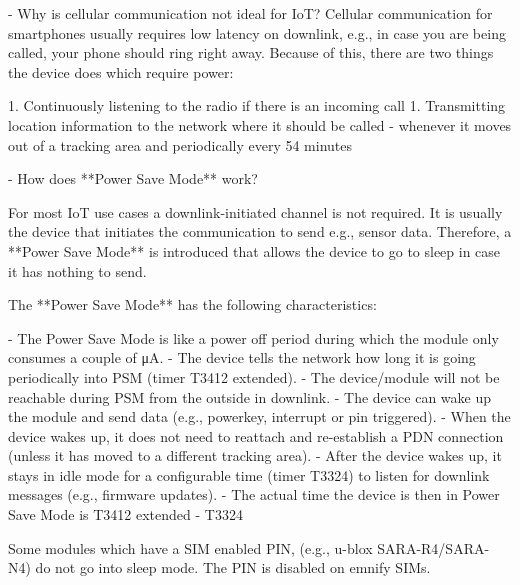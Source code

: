 \documentclass[11pt, oneside]{article}   	%
\newcommand{\addspace}{\vspace{2mm}}
\begin{document}
\addspace
\begin{markdown}
- Why is cellular communication not ideal for IoT?  
Cellular communication for smartphones usually requires low latency on downlink, e.g., in case you are being called, your phone should ring right away.
Because of this, there are two things the device does which require power:  
\end{markdown}
\addspace
\begin{markdown}
  1. Continuously listening to the radio if there is an incoming call
  1. Transmitting location information to the network where it should be called - whenever it moves out of a tracking area and periodically every 54 minutes  
\end{markdown}
\addspace
\begin{markdown}
- How does **Power Save Mode** work?  
\end{markdown}
\addspace
\begin{markdown}
For most IoT use cases a downlink-initiated channel is not required.
It is usually the device that initiates the communication to send e.g., sensor data.
Therefore, a **Power Save Mode** is introduced that allows the device to go to sleep in case it has nothing to send.  
\end{markdown}
\addspace
\begin{markdown}
The **Power Save Mode** has the following characteristics:
\end{markdown}
\addspace
\begin{markdown}
  - The Power Save Mode is like a power off period during which the module only consumes a couple of μA.
  - The device tells the network how long it is going periodically into PSM (timer T3412 extended).
  - The device/module will not be reachable during PSM from the outside in downlink.
  - The device can wake up the module and send data (e.g., powerkey, interrupt or pin triggered).
  - When the device wakes up, it does not need to reattach and re-establish a PDN connection (unless it has moved to a different tracking area).
  - After the device wakes up, it stays in idle mode for a configurable time (timer T3324) to listen for downlink messages (e.g., firmware updates).
  - The actual time the device is then in Power Save Mode is T3412 extended - T3324
\end{markdown}

\begin{tcolorbox}[colback=blue!5!white,colframe=blue!75!black,title=Note]
Some modules which have a SIM enabled PIN, (e.g., u-blox SARA-R4/SARA-N4) do not go into sleep mode.
  The PIN is disabled on emnify SIMs.
\end{tcolorbox}
\end{document}
